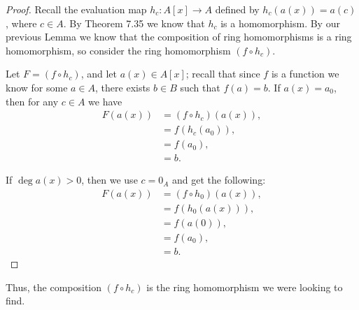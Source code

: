 \documentclass[letterpaper, 12pt]{amsart}
\begin{document}
	\begin{proof}
	Recall the evaluation map $h_{c}: A[x] \to A$ defined by $h_{c}(a(x)) = a(c)$, where $c \in A$.
	By Theorem 7.35 we know that $h_{c}$ is a homomorphism.
	By our previous Lemma we know that the composition of ring homomorphisms is a ring homomorphism, so consider the ring homomorphism $(f \circ h_{c})$.

	Let $F = (f \circ h_{c})$, and let $a(x) \in A[x]$; recall that since $f$ is a function we know for some $a \in A$, there exists $b \in B$ such that $f(a) = b$.
	If $a(x) = a_{0}$, then for any $c \in A$ we have
		\begin{align*}
		F(a(x)) &= (f \circ h_{c})(a(x)), \\
		&= f(h_{c}(a_{0})), \\
		&= f(a_{0}), \\
		&= b.
		\end{align*}
	
	If $\deg{a(x)} > 0$, then we use $c = 0_{A}$ and get the following:
		\begin{align*}
		F(a(x)) &= (f \circ h_{0})(a(x)), \\
		&= f(h_{0}(a(x))), \\
		&= f(a(0)), \\
		&= f(a_{0}), \\
		&= b.
		\end{align*}
	\end{proof}

	Thus, the composition $(f \circ h_{c})$ is the ring homomorphism we were looking to find.
\end{document}
